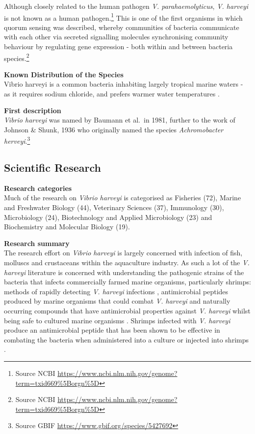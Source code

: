 \documentclass[]{book}
\let\rmarkdownfootnote\footnote%
\def\footnote{\protect\rmarkdownfootnote}
\theoremstyle{definition}
\theoremstyle{definition}
\theoremstyle{definition}
\theoremstyle{remark}
\begin{document}
Although closely related to the human pathogen \emph{V.
parahaemolyticus}, \emph{V. harveyi} is not known as a human
pathogen.\footnote{Source NCBI
  \url{https://www.ncbi.nlm.nih.gov/genome?term=txid669\%5Borgn\%5D}}
This is one of the first organisms in which quorum sensing was
described, whereby communities of bacteria communicate with each other
via secreted signalling molecules synchronising community behaviour by
regulating gene expression - both within and between bacteria
species.\footnote{Source NCBI
  \url{https://www.ncbi.nlm.nih.gov/genome?term=txid669\%5Borgn\%5D}}

\textbf{Known Distribution of the Species}\\
Vibrio harveyi is a common bacteria inhabiting largely tropical marine
waters - as it requires sodium chloride, and prefers warmer water
temperatures \citep{Austin_2006}.

\textbf{First description}\\
\emph{Vibrio harveyi} was named by Baumann et al.~in 1981, further to
the work of Johnson \& Shunk, 1936 who originally named the species
\emph{Achromobacter herveyi}.\footnote{Source GBIF
  \url{https://www.gbif.org/species/5427692}}

\hypertarget{scientific-research-8}{%
\subsection{Scientific Research}\label{scientific-research-8}}

\textbf{Research categories}\\
Much of the research on \emph{Vibrio harveyi} is categorised as
Fisheries (72), Marine and Freshwater Biology (44), Veterinary Sciences
(37), Immunology (30), Microbiology (24), Biotechnology and Applied
Microbiology (23) and Biochemistry and Molecular Biology (19).

\textbf{Research summary}\\
The research effort on \emph{Vibrio harveyi} is largely concerned with
infection of fish, molluscs and crustaceans within the aquaculture
industry. As such a lot of the \emph{V. harveyi} literature is concerned
with understanding the pathogenic strains of the bacteria that infects
commercially farmed marine organisms, particularly shrimps: methods of
rapidly detecting \emph{V. harveyi} infections \citep{Conejero_2003},
antimicrobial peptides produced by marine organisms that could combat
\emph{V. harveyi} and naturally occurring compounds that have
antimicrobial properties against \emph{V. harveyi} whilst being safe to
cultured marine organisms \citep{Ponprateep_2009, Maneechote_2016}.
Shrimps infected with \emph{V. harveyi} produce an antimicrobial peptide
that has been shown to be effective in combating the bacteria when
administered into a culture or injected into shrimps
\citep{Ponprateep_2009}.
\end{document}
